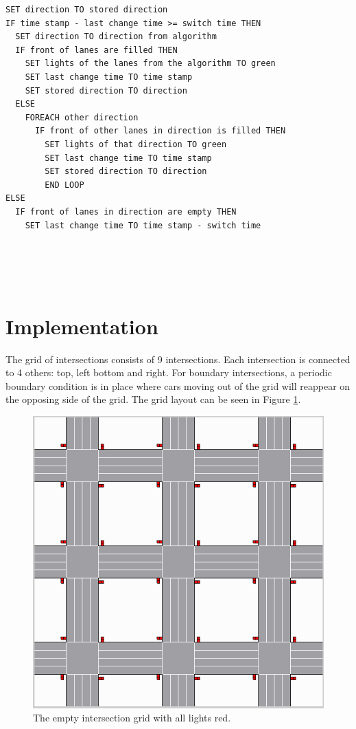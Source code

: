\documentclass[a4paper,11pt]{article}
\begin{document}
\begin{lstlisting}
SET direction TO stored direction
IF time stamp - last change time >= switch time THEN
  SET direction TO direction from algorithm
  IF front of lanes are filled THEN
    SET lights of the lanes from the algorithm TO green
    SET last change time TO time stamp
    SET stored direction TO direction
  ELSE
    FOREACH other direction
      IF front of other lanes in direction is filled THEN
        SET lights of that direction TO green
        SET last change time TO time stamp
        SET stored direction TO direction
        END LOOP
ELSE
  IF front of lanes in direction are empty THEN
    SET last change time TO time stamp - switch time

  
	
  
\end{lstlisting}



\section{Implementation}\label{sec:implementation}

The grid of intersections consists of 9 intersections.
Each intersection is connected to 4 others: top, left bottom and right.
For boundary intersections, a periodic boundary condition is in place where
cars moving out of the grid will reappear on the opposing side of the grid.
The grid layout can be seen in Figure \ref{fig:intersections}.

\begin{figure}[H]
  \centering
  \includegraphics[width=.8\linewidth]{img/intersections.png}
  \caption{The empty intersection grid with all lights red.}
  \label{fig:intersections}
\end{figure}
\end{document}

